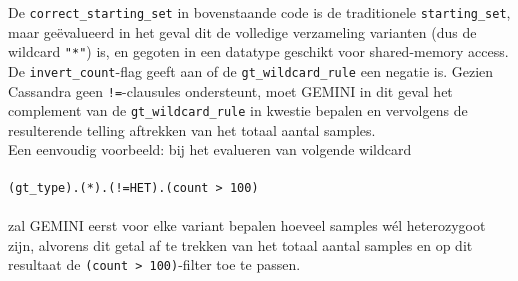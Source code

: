 

\noindent De \texttt{correct\_starting\_set} in bovenstaande code is de traditionele \texttt{starting\_set}, maar ge\"evalueerd in het geval dit de volledige verzameling varianten (dus de wildcard \texttt{"*"}) is, en gegoten in een datatype geschikt voor shared-memory access.\\
De \texttt{invert\_count}-flag geeft aan of de \texttt{gt\_wildcard\_rule} een negatie is. Gezien Cassandra geen \texttt{!=}-clausules ondersteunt, moet GEMINI in dit geval het complement van de \texttt{gt\_wildcard\_rule} in kwestie bepalen en vervolgens de resulterende telling aftrekken van het totaal aantal samples. \\ Een eenvoudig voorbeeld: bij het evalueren van volgende wildcard \\\\ 
\texttt{(gt\_type).(*).(!=HET).(count > 100)}\\\\
zal GEMINI eerst voor elke variant bepalen hoeveel samples w\'el heterozygoot zijn, alvorens dit getal af te trekken van het totaal aantal samples en op dit resultaat de \texttt{(count > 100)}-filter toe te passen.